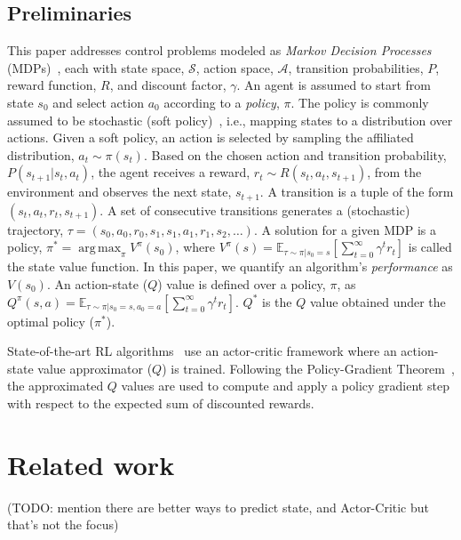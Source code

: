 \documentclass{article}
\DeclareMathOperator*{\argmax}{arg\,max}
\begin{document}
        \subsection{Preliminaries}
            This paper addresses control problems modeled as \textit{Markov Decision Processes} (MDPs)~\cite{puterman2014markov}, each with state space, $\mathcal{S}$, action space, $\mathcal{A}$, transition probabilities, $P$, reward function, $R$, and discount factor, $\gamma$. 
            An agent is assumed to start from state $s_0$ and select action $a_0$ according to a \textit{policy}, $\pi$. The policy is commonly assumed to be stochastic (soft policy)~\cite{haarnoja2018soft}, i.e., mapping states to a distribution over actions.
            Given a soft policy, an action is selected by sampling the affiliated distribution, $a_t \sim \pi(s_t)$. Based on the chosen action and transition probability, $P(s_{t+1} | s_t, a_t)$, the agent receives a reward, $r_t \sim R(s_t, a_t, s_{t+1})$, from the environment and observes the next state, $s_{t+1}$. A transition is a tuple of the form $(s_t,a_t,r_t,s_{t+1})$. A set of consecutive transitions generates a (stochastic) trajectory, $\tau = (s_0, a_0, r_0, s_1, s_1, a_1, r_1, s_2,\ldots)$. A solution for a given MDP is a policy, $\pi^* = \argmax_{\pi} V^{\pi}(s_0)$, where $V^{\pi}(s)=\mathbb{E}_{\tau \sim \pi| s_0=s}[\sum_{t=0}^{\infty}\gamma^t r_t]$ is called the state value function. In this paper, we quantify an algorithm's \textit{performance} as $V(s_0)$. An action-state ($Q$) value is defined over a policy, $\pi$, as $Q^\pi(s,a)=\mathbb{E}_{\tau \sim \pi | s_0=s, a_0=a}[\sum_{t=0}^{\infty}\gamma^t r_t]$. $Q^*$ is the $Q$ value obtained under the optimal policy ($\pi^*$). %

            State-of-the-art RL algorithms~\cite{haarnoja2018soft} use an actor-critic framework where an action-state value approximator ($Q$) is trained. Following the Policy-Gradient Theorem~\cite{reinforce}, the approximated $Q$ values are used to compute and apply a policy gradient step with respect to the expected sum of discounted rewards.

    \section{Related work}
        
        (TODO: mention there are better ways to predict state, and Actor-Critic but that's not the focus)
        
\end{document}
